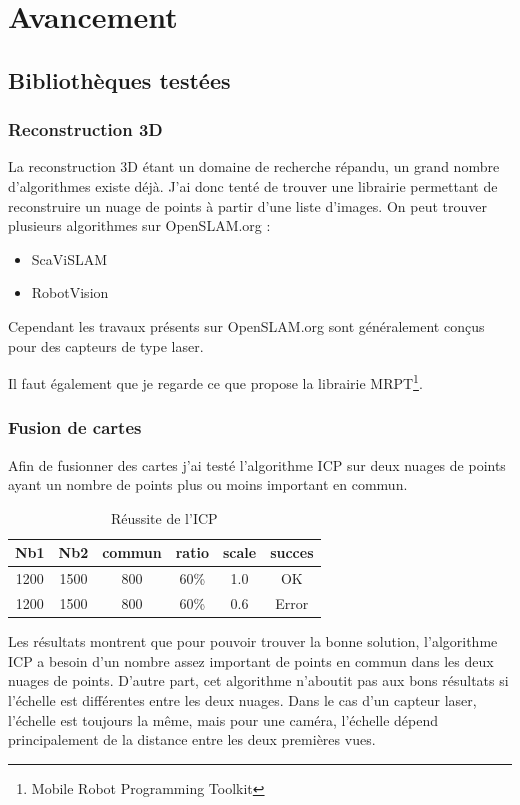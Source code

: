 \section{Avancement}

\subsection{Bibliothèques testées}

\subsubsection{Reconstruction 3D}

La reconstruction 3D étant un domaine de recherche répandu, un grand nombre d'algorithmes existe déjà. J'ai donc tenté de trouver une librairie permettant de reconstruire un nuage de points à partir d'une liste d'images.
On peut trouver plusieurs algorithmes sur OpenSLAM.org :
\begin{itemize}
  \item ScaViSLAM
  \item RobotVision
\end{itemize}

Cependant les travaux présents sur OpenSLAM.org sont généralement conçus pour des capteurs de type laser.

Il faut également que je regarde ce que propose la librairie MRPT\footnote{Mobile Robot Programming Toolkit}.

\subsubsection{Fusion de cartes}

Afin de fusionner des cartes j'ai testé l'algorithme ICP sur deux nuages de points ayant un nombre de points plus ou moins important en commun.

\begin{table}[h]
  \begin{center}
    \begin{tabular}{|c|c|c|c|c|c|}
    \hline
    Nb1 & Nb2 & commun & ratio & scale & succes \\
    \hline
    1200 & 1500 & 800 & 60\% & 1.0 & OK \\
    1200 & 1500 & 800 & 60\% & 0.6 & Error \\
    \hline
    \end{tabular}
  \caption{Réussite de l'ICP}
  \end{center}
\end{table}
Les résultats montrent que pour pouvoir trouver la bonne solution, l'algorithme ICP a besoin d'un nombre assez important de points en commun dans les deux nuages de points.
D'autre part, cet algorithme n'aboutit pas aux bons résultats si l'échelle est différentes entre les deux nuages.
Dans le cas d'un capteur laser, l'échelle est toujours la même, mais pour une caméra, l'échelle dépend principalement de la distance entre les deux premières vues.


